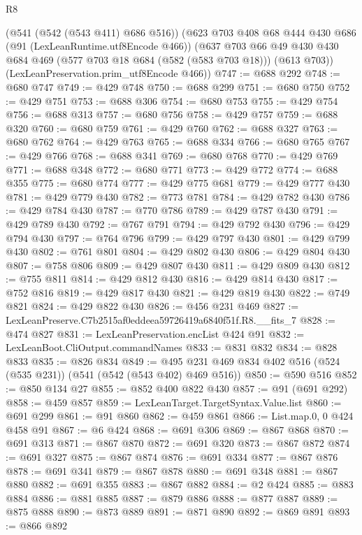 \begin{lexlean}{R8}
\begin{coremodule}
    (@541 (@542 (@543 @411) @686 @516))
    (@623
      @703
      @408
      @68
      @444
      @430
      @686
      (@91 (LexLeanRuntime.utf8Encode @466))
      (@637
        @703
        @66
        @49
        @430
        @430
        @684
        @469
        (@577 @703 @18 @684 (@582 (@583 @703 @18)))
        (@613 @703))
      (LexLeanPreservation.prim_utf8Encode @466))
@747 := @688 @292
@748 := @680 @747
@749 := @429 @748
@750 := @688 @299
@751 := @680 @750
@752 := @429 @751
@753 := @688 @306
@754 := @680 @753
@755 := @429 @754
@756 := @688 @313
@757 := @680 @756
@758 := @429 @757
@759 := @688 @320
@760 := @680 @759
@761 := @429 @760
@762 := @688 @327
@763 := @680 @762
@764 := @429 @763
@765 := @688 @334
@766 := @680 @765
@767 := @429 @766
@768 := @688 @341
@769 := @680 @768
@770 := @429 @769
@771 := @688 @348
@772 := @680 @771
@773 := @429 @772
@774 := @688 @355
@775 := @680 @774
@777 := @429 @775 @681
@779 := @429 @777 @430
@781 := @429 @779 @430
@782 := @773 @781
@784 := @429 @782 @430
@786 := @429 @784 @430
@787 := @770 @786
@789 := @429 @787 @430
@791 := @429 @789 @430
@792 := @767 @791
@794 := @429 @792 @430
@796 := @429 @794 @430
@797 := @764 @796
@799 := @429 @797 @430
@801 := @429 @799 @430
@802 := @761 @801
@804 := @429 @802 @430
@806 := @429 @804 @430
@807 := @758 @806
@809 := @429 @807 @430
@811 := @429 @809 @430
@812 := @755 @811
@814 := @429 @812 @430
@816 := @429 @814 @430
@817 := @752 @816
@819 := @429 @817 @430
@821 := @429 @819 @430
@822 := @749 @821
@824 := @429 @822 @430
@826 := @456 @231 @469
@827 := LexLeanPreserve.C7b2515af0eddeea59726419a6840f51f.R8.__fits_7
@828 := @474 @827
@831 := LexLeanPreservation.encList @424 @91
@832 := LexLeanBoot.CliOutput.commandNames
@833 := @831 @832
@834 := @828 @833
@835 := @826 @834
@849 := @495 @231 @469 @834 @402 @516 (@524 (@535 @231)) (@541 (@542 (@543 @402) @469 @516))
@850 := @590 @516
@852 := @850 @134 @27
@855 := @852 @400 @822 @430
@857 := @91 (@691 @292)
@858 := @459 @857
@859 := LexLeanTarget.TargetSyntax.Value.list
@860 := @691 @299
@861 := @91 @860
@862 := @459 @861
@866 := List.map.{0, 0} @424 @458 @91
@867 := @6 @424
@868 := @691 @306
@869 := @867 @868
@870 := @691 @313
@871 := @867 @870
@872 := @691 @320
@873 := @867 @872
@874 := @691 @327
@875 := @867 @874
@876 := @691 @334
@877 := @867 @876
@878 := @691 @341
@879 := @867 @878
@880 := @691 @348
@881 := @867 @880
@882 := @691 @355
@883 := @867 @882
@884 := @2 @424
@885 := @883 @884
@886 := @881 @885
@887 := @879 @886
@888 := @877 @887
@889 := @875 @888
@890 := @873 @889
@891 := @871 @890
@892 := @869 @891
@893 := @866 @892

\end{coremodule}
\end{lexlean}
